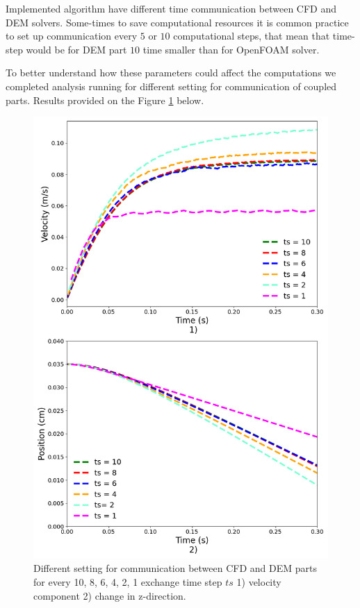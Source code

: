 Implemented algorithm have different time communication between CFD and DEM solvers. Some-times to save computational resources it is common practice to set up communication every $5$ or $10$ computational steps, that mean that time-step would be for DEM part $10$ time smaller than for OpenFOAM solver.

To better understand how these parameters could affect the computations we completed analysis running for different setting for communication of coupled parts. Results provided on the Figure \ref{fig:communication} below.

\begin{figure}[!h]
    \centering
    \includegraphics[width=13cm]{ GWU_Thesis_Sarmakeeva/Images/chap3/nan_simulation_192000_diff_exchange_time.png}
   \caption{Different setting for communication between CFD and DEM parts for every 10, 8, 6, 4, 2, 1 exchange time step  $ts$ 1) velocity component 2) change in z-direction.}
    \label{fig:communication}
\end{figure}

